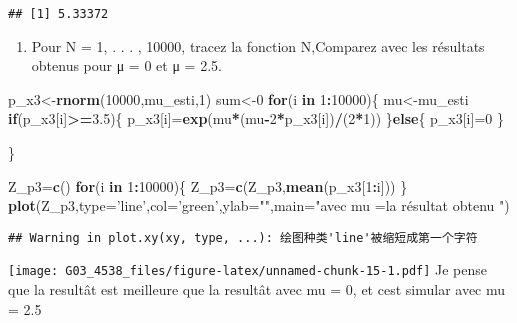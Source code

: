 \documentclass[]{article}
\newenvironment{Shaded}{\begin{snugshade}}{\end{snugshade}}
\newcommand{\KeywordTok}[1]{\textcolor[rgb]{0.13,0.29,0.53}{\textbf{#1}}}
\newcommand{\DataTypeTok}[1]{\textcolor[rgb]{0.13,0.29,0.53}{#1}}
\newcommand{\DecValTok}[1]{\textcolor[rgb]{0.00,0.00,0.81}{#1}}
\newcommand{\FloatTok}[1]{\textcolor[rgb]{0.00,0.00,0.81}{#1}}
\newcommand{\StringTok}[1]{\textcolor[rgb]{0.31,0.60,0.02}{#1}}
\newcommand{\ControlFlowTok}[1]{\textcolor[rgb]{0.13,0.29,0.53}{\textbf{#1}}}
\newcommand{\OperatorTok}[1]{\textcolor[rgb]{0.81,0.36,0.00}{\textbf{#1}}}
\newcommand{\NormalTok}[1]{#1}
\providecommand{\tightlist}{%
  \setlength{\itemsep}{0pt}\setlength{\parskip}{0pt}}
\begin{document}
\begin{verbatim}
## [1] 5.33372
\end{verbatim}

\begin{enumerate}
\def\labelenumi{(\alph{enumi})}
\setcounter{enumi}{2}
\tightlist
\item
  Pour N = 1, . . . , 10000, tracez la fonction N,Comparez avec les
  résultats obtenus pour μ = 0 et μ = 2.5.
\end{enumerate}

\begin{Shaded}
\begin{Highlighting}[]
\NormalTok{p_x3<-}\KeywordTok{rnorm}\NormalTok{(}\DecValTok{10000}\NormalTok{,mu_esti,}\DecValTok{1}\NormalTok{)}
\NormalTok{sum<-}\DecValTok{0}
\ControlFlowTok{for}\NormalTok{(i }\ControlFlowTok{in} \DecValTok{1}\OperatorTok{:}\DecValTok{10000}\NormalTok{)\{}
\NormalTok{  mu<-mu_esti}
  \ControlFlowTok{if}\NormalTok{(p_x3[i]}\OperatorTok{>=}\FloatTok{3.5}\NormalTok{)\{}
\NormalTok{  p_x3[i]=}\KeywordTok{exp}\NormalTok{(mu}\OperatorTok{*}\NormalTok{(mu}\OperatorTok{-}\DecValTok{2}\OperatorTok{*}\NormalTok{p_x3[i])}\OperatorTok{/}\NormalTok{(}\DecValTok{2}\OperatorTok{*}\DecValTok{1}\NormalTok{))}
\NormalTok{  \}}\ControlFlowTok{else}\NormalTok{\{}
\NormalTok{    p_x3[i]=}\DecValTok{0}
\NormalTok{  \}}

\NormalTok{\}}

\NormalTok{Z_p3=}\KeywordTok{c}\NormalTok{()}
\ControlFlowTok{for}\NormalTok{(i }\ControlFlowTok{in} \DecValTok{1}\OperatorTok{:}\DecValTok{10000}\NormalTok{)\{}
\NormalTok{  Z_p3=}\KeywordTok{c}\NormalTok{(Z_p3,}\KeywordTok{mean}\NormalTok{(p_x3[}\DecValTok{1}\OperatorTok{:}\NormalTok{i]))}
\NormalTok{\}}
\KeywordTok{plot}\NormalTok{(Z_p3,}\DataTypeTok{type=}\StringTok{'line'}\NormalTok{,}\DataTypeTok{col=}\StringTok{'green'}\NormalTok{,}\DataTypeTok{ylab=}\StringTok{""}\NormalTok{,}\DataTypeTok{main=}\StringTok{"avec mu =la résultat obtenu "}\NormalTok{)}
\end{Highlighting}
\end{Shaded}

\begin{verbatim}
## Warning in plot.xy(xy, type, ...): 绘图种类'line'被缩短成第一个字符
\end{verbatim}

\texttt{[image: G03\_4538\_files/figure-latex/unnamed-chunk-15-1.pdf]} Je
pense que la resultât est meilleure que la resultât avec mu = 0, et cest
simular avec mu = 2.5
\end{document}
